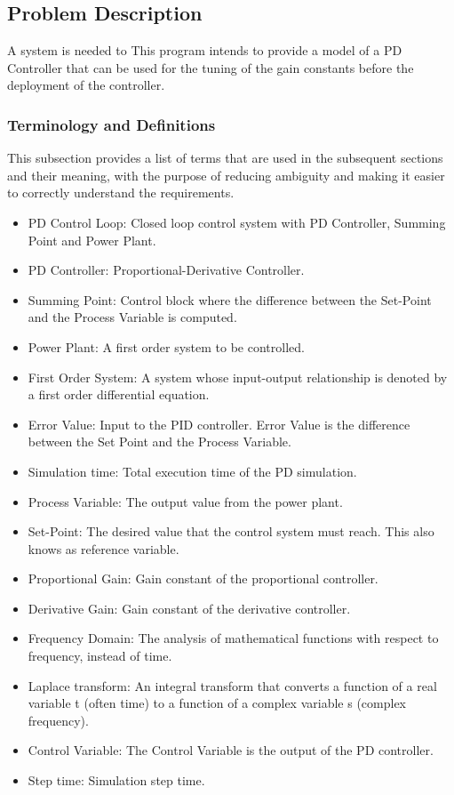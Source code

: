 \documentclass[12pt]{article}
\begin{document}
\subsection{Problem Description}
\label{Sec:ProbDesc}
A system is needed to This program intends to provide a model of a PD Controller  that can be used for the tuning of the gain constants before  the deployment of the controller.

\subsubsection{Terminology and Definitions}
\label{Sec:TermDefs}
This subsection provides a list of terms that are used in the subsequent sections and their meaning, with the purpose of reducing ambiguity and making it easier to correctly understand the requirements.

\begin{itemize}
\item{PD Control Loop: Closed loop control system with PD Controller, Summing Point and Power Plant.}
\item{PD Controller: Proportional-Derivative Controller.}
\item{Summing Point: Control block where the difference between the Set-Point and the Process Variable is computed.}
\item{Power Plant: A first order system to be controlled.}
\item{First Order System: A system whose input-output relationship is denoted by a first order differential equation.}
\item{Error Value: Input to the PID controller. Error Value is the difference between the Set Point and the Process Variable.}
\item{Simulation time: Total execution time of the PD simulation.}
\item{Process Variable: The output value from the power plant.}
\item{Set-Point: The desired value that the control system must reach. This also knows as reference variable.}
\item{Proportional Gain: Gain constant of the proportional controller.}
\item{Derivative Gain: Gain constant of the derivative controller.}
\item{Frequency Domain: The analysis of mathematical functions with respect to frequency, instead of time.}
\item{Laplace transform: An integral transform that converts a function of a real variable t (often time) to a function of a complex variable s (complex frequency).}
\item{Control Variable: The Control Variable is the output of the PD controller.}
\item{Step time: Simulation step time.}
\end{itemize}
\end{document}
